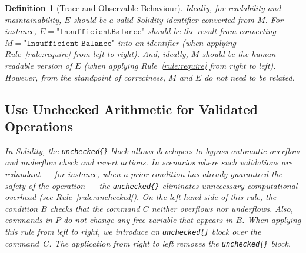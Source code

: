 \documentclass[manuscript,screen,review]{acmart}
\newtheorem{definition}{Definition}
\begin{document}
\begin{definition}[Trace and Observable Behaviour]
Ideally, for readability and maintainability, $\mathit{E}$ should be a valid Solidity identifier converted from $M$. For instance,  $E = \texttt{"InsufficientBalance"}$ should be the result from converting $M = \texttt{"Insufficient Balance"}$ into an identifier (when applying Rule~\ref{rule:require} from left to right). And, ideally, $M$ should be the human-readable version of $E$ (when applying Rule~\ref{rule:require} from right to left). However, from the standpoint of correctness, $M$ and $E$ do not need to be related.

\subsection{Use Unchecked Arithmetic for Validated Operations}

In Solidity, the \texttt{unchecked\{\}} block allows developers to bypass automatic overflow and underflow check and revert actions. In scenarios where such validations are redundant --- for instance, when a prior condition has already guaranteed the safety of the operation --- the \texttt{unchecked\{\}} eliminates unnecessary computational overhead (see Rule~\ref{rule:unchecked}). On the left-hand side of this rule, the condition $B$ checks that the command $C$ neither overflows nor underflows. Also, commands in $P$ do not change any free variable that appears in $B$. When applying this rule from left to right, we introduce an \texttt{unchecked\{\}} block over the command~$C$. The application from right to left removes the \texttt{unchecked\{\}} block.



\end{definition}
\end{document}
